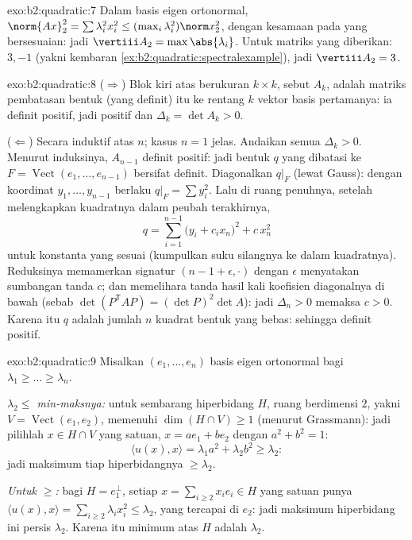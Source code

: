 \begin{solution}{exo:b2:quadratic:7}
Dalam basis eigen ortonormal, $\norm{Ax}_2^2 = \sum \lambda_i^2
x_i^2 \leq (\max_i \lambda_i^2)\norm x_2^2$, dengan kesamaan pada  yang bersesuaian: jadi $\vertiii A_2 = \max\abs{\lambda_i}$.
Untuk matriks yang diberikan:  $3, -1$
(yakni kembaran \cref{ex:b2:quadratic:spectralexample}), jadi
$\vertiii A_2 = 3$.
\end{solution}

\begin{solution}{exo:b2:quadratic:8}
($\Rightarrow$) Blok kiri atas berukuran $k \times k$, sebut $A_k$, adalah
matriks pembatasan bentuk (yang definit) itu ke rentang $k$ vektor
basis pertamanya: ia definit positif, jadi 
positif dan $\Delta_k = \det A_k > 0$.

($\Leftarrow$) Secara induktif atas $n$; kasus $n = 1$ jelas. Andaikan semua
$\Delta_k > 0$. Menurut induksinya, $A_{n-1}$ definit positif: jadi
bentuk $q$ yang dibatasi ke $F = \operatorname{Vect}(e_1, \dots,
e_{n-1})$ bersifat definit. Diagonalkan $q|_F$ (lewat Gauss): dengan koordinat
$y_1, \dots, y_{n-1}$ berlaku $q|_F = \sum y_i^2$. Lalu di ruang penuhnya,
setelah melengkapkan kuadratnya dalam peubah terakhirnya,
\[
q = \sum_{i=1}^{n-1} \bigl(y_i + c_i x_n\bigr)^2 + c\,x_n^2
\]
untuk konstanta yang sesuai (kumpulkan suku silangnya ke dalam kuadratnya).
Reduksinya memamerkan signatur $(n-1 + \epsilon, \cdot)$ dengan
$\epsilon$ menyatakan sumbangan tanda $c$; dan  memelihara
tanda hasil kali koefisien diagonalnya di bawah
 (sebab $\det(P^{\mathsf T}AP) = (\det P)^2\det A$): jadi $\Delta_n
> 0$ memaksa $c > 0$. Karena itu $q$ adalah jumlah $n$ kuadrat
bentuk yang bebas: sehingga definit positif.
\end{solution}

\begin{solution}{exo:b2:quadratic:9}
Misalkan $(e_1, \dots, e_n)$ basis eigen ortonormal bagi $\lambda_1
\geq \dots \geq \lambda_n$.

\emph{$\lambda_2 \leq$ min-maksnya:} untuk sembarang hiperbidang $H$,
ruang berdimensi $2$, yakni $V = \operatorname{Vect}(e_1, e_2)$, memenuhi
$\dim(H \cap V) \geq 1$ (menurut Grassmann): jadi pilihlah $x \in H \cap V$
yang satuan, $x = ae_1 + be_2$ dengan $a^2 + b^2 = 1$:
\[
\langle u(x), x\rangle = \lambda_1 a^2 + \lambda_2 b^2 \geq
\lambda_2 :
\]
jadi maksimum tiap hiperbidangnya $\geq \lambda_2$.

\emph{Untuk $\geq$:} bagi $H = e_1^{\perp}$, setiap $x = \sum_{i\geq2}
x_ie_i \in H$ yang satuan punya $\langle u(x), x\rangle = \sum_{i \geq 2}
\lambda_i x_i^2 \leq \lambda_2$, yang tercapai di $e_2$: jadi
maksimum hiperbidang ini persis $\lambda_2$. Karena itu minimum atas $H$
adalah $\lambda_2$.
\end{solution}

